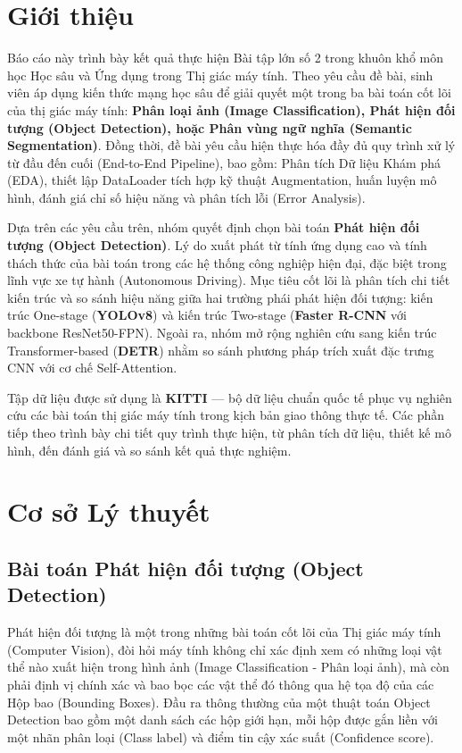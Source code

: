 \documentclass[a4paper]{article}
\theoremstyle{definition}
\begin{document}
\newpage
\tableofcontents
\newpage

\section{Giới thiệu}
Báo cáo này trình bày kết quả thực hiện Bài tập lớn số 2 trong khuôn khổ môn học Học sâu và Ứng dụng trong Thị giác máy tính. Theo yêu cầu đề bài, sinh viên áp dụng kiến thức mạng học sâu để giải quyết một trong ba bài toán cốt lõi của thị giác máy tính: \textbf{Phân loại ảnh (Image Classification), Phát hiện đối tượng (Object Detection), hoặc Phân vùng ngữ nghĩa (Semantic Segmentation)}. Đồng thời, đề bài yêu cầu hiện thực hóa đầy đủ quy trình xử lý từ đầu đến cuối (End-to-End Pipeline), bao gồm: Phân tích Dữ liệu Khám phá (EDA), thiết lập DataLoader tích hợp kỹ thuật Augmentation, huấn luyện mô hình, đánh giá chỉ số hiệu năng và phân tích lỗi (Error Analysis).

Dựa trên các yêu cầu trên, nhóm quyết định chọn bài toán \textbf{Phát hiện đối tượng (Object Detection)}. Lý do xuất phát từ tính ứng dụng cao và tính thách thức của bài toán trong các hệ thống công nghiệp hiện đại, đặc biệt trong lĩnh vực xe tự hành (Autonomous Driving). Mục tiêu cốt lõi là phân tích chi tiết kiến trúc và so sánh hiệu năng giữa hai trường phái phát hiện đối tượng: kiến trúc One-stage (\textbf{YOLOv8}) và kiến trúc Two-stage (\textbf{Faster R-CNN} với backbone ResNet50-FPN). Ngoài ra, nhóm mở rộng nghiên cứu sang kiến trúc Transformer-based (\textbf{DETR}) nhằm so sánh phương pháp trích xuất đặc trưng CNN với cơ chế Self-Attention.

Tập dữ liệu được sử dụng là \textbf{KITTI} \cite{kitti} --- bộ dữ liệu chuẩn quốc tế phục vụ nghiên cứu các bài toán thị giác máy tính trong kịch bản giao thông thực tế. Các phần tiếp theo trình bày chi tiết quy trình thực hiện, từ phân tích dữ liệu, thiết kế mô hình, đến đánh giá và so sánh kết quả thực nghiệm.

\section{Cơ sở Lý thuyết}

\subsection{Bài toán Phát hiện đối tượng (Object Detection)}
Phát hiện đối tượng là một trong những bài toán cốt lõi của Thị giác máy tính (Computer Vision), đòi hỏi máy tính không chỉ xác định xem có những loại vật thể nào xuất hiện trong hình ảnh (Image Classification - Phân loại ảnh), mà còn phải định vị chính xác và bao bọc các vật thể đó thông qua hệ tọa độ của các Hộp bao (Bounding Boxes). Đầu ra thông thường của một thuật toán Object Detection bao gồm một danh sách các hộp giới hạn, mỗi hộp được gắn liền với một nhãn phân loại (Class label) và điểm tin cậy xác suất (Confidence score).
\end{document}
